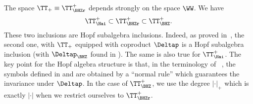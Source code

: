 \documentclass{article}
\begin{document}



\begin{remark} The space $ \TT_+ \equiv  \TT^+_{\BHZr} $ depends strongly on the space $ \WW $. We have 
$$
     \TT^+_{\Hai} \subset  \TT^+_{\BHZr} \subset  \TT^+_{\BHZ}.
$$
These two inclusions are Hopf subalgebra inclusions.
Indeed, as proved in~\cite{BHZ16}, the second one, with
 $ \TT_+$ equipped with coproduct $\Deltap$ is a Hopf subalgebra inclusion (with $\Deltap_{\BHZ}$ found in \cite[(4.14)]{BHZ16}). The same is also true for $ \TT^+_{\Hai} $. The key point for the Hopf algebra structure is that, in the terminology of ~\cite{BHZ16}, the symbols defined in \cite{Hairer14} and \cite{BHZ16} are obtained by a ``normal rule'' which guarantees the invariance under $ \Deltap $.
 In the case of $ \TT^{+}_{\BHZ} $, we use  the degree $ | \cdot |_+ $ which is exactly $ |\cdot| $ when we restrict ourselves to $ \TT^{+}_{\BHZr} $. 
\end{remark}
\end{document}
